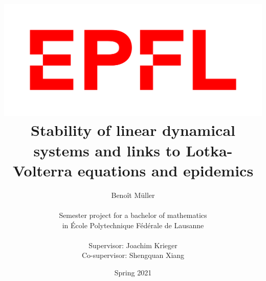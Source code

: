 \documentclass[a4paper]{report}
\title{\includegraphics[scale=0.15]{images/EPFL-logo.png} \\ Stability of linear dynamical systems and links to Lotka-Volterra equations and epidemics}
\author{Benoît Müller \\ \\
Semester project for a bachelor of mathematics \\ in École Polytechnique Fédérale de Lausanne \\ \\
Supervisor: Joachim Krieger \\
Co-supervisor: Shengquan Xiang }
\date{Spring 2021}
\theoremstyle{definition}
\theoremstyle{remark}
\begin{document}
    \maketitle
    
    \tableofcontents
    
    
    
     
    
    \nocite{*}
    \printbibliography
\end{document}
